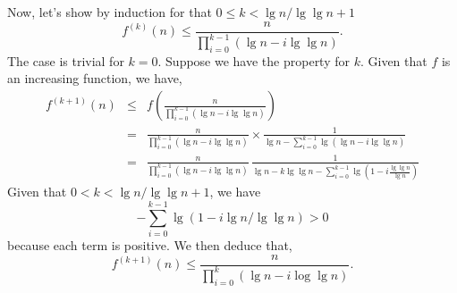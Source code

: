 \documentclass[a4paper,12pt]{article}
\begin{document}
\medskip
Now, let's show by induction for that $0 \le k < \lg n/\lg \lg n + 1$
\[ f^{(k)}(n) \le \frac{n}{\prod_{i=0}^{k-1}(\lg n - i \lg \lg n)}.\]
The case is trivial for $k=0$.  Suppose we have the property for $k$.
Given that $f$ is an increasing function, we have,
\begin{eqnarray*}
f^{(k+1)}(n) &\le& f\left(\frac{n}
{\prod_{i=0}^{k-1}(\lg n - i \lg \lg n)}\right) \\
&=& \frac{n}{\prod_{i=0}^{k-1}(\lg n - i \lg \lg n)} \times
\frac{1}{\lg n - \sum_{i=0}^{k-1}\lg (\lg n - i \lg \lg n)} \\
&=& \frac{n}{\prod_{i=0}^{k-1}(\lg n - i \lg \lg n)}\,
\frac{1}{\lg n - k \lg \lg n - 
\sum_{i=0}^{k-1}\lg \left(1 - i \frac{\lg \lg n}{\lg n}\right)}
\end{eqnarray*}
Given that $0 < k < \lg n / \lg \lg n + 1$, we have
\[ - \sum_{i=0}^{k-1}\lg(1 - i \lg n/\lg \lg n) > 0\]
because each term is positive.
We then deduce that,
\[ f^{(k+1)}(n) \le \frac{n}{\prod_{i=0}^{k}(\lg n - i \log \lg n)}.\]
\end{document}
